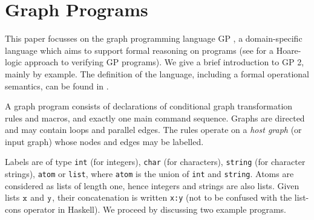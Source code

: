 \section{Graph Programs}
\label{sec:graph-programs}

This paper focusses on the graph programming language GP \cite{Plump09a,Plump12a}, a domain-specific language which aims to support formal reasoning on programs (see \cite{Poskitt-Plump12a} for a Hoare-logic approach to verifying GP programs). We give a brief introduction to GP 2, mainly by example. The definition of the language, including a formal operational semantics, can be found in \cite{Plump12a}. 

A graph program consists of declarations of conditional graph transformation rules and macros, and exactly one main command sequence. Graphs are directed and may contain  loops and parallel edges. The rules operate on a \emph{host graph}\/ (or input graph) whose nodes and edges may be labelled.

Labels are of type \texttt{int} (for integers), \texttt{char} (for characters), \texttt{string} (for character strings), \texttt{atom} or \texttt{list}, where \texttt{atom} is the union of \texttt{int} and \texttt{string}. Atoms are considered as lists of length one, hence integers and strings are also lists. Given lists $\mathtt{x}$ and $\mathtt{y}$, their concatenation is written \texttt{x:y} (not to be confused with the list-cons operator in Haskell). 
We proceed by discussing two example programs.

